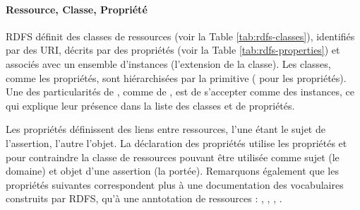 \paragraph{Ressource, Classe, Propriété}
RDFS définit des classes de ressources (voir la Table \ref{tab:rdfs-classes}), identifiés par des URI, décrits par des propriétés (voir la Table \ref{tab:rdfs-properties}) et associés avec un ensemble d'instances (l'extension de la classe). 
Les classes, comme les propriétés, sont hiérarchisées par la primitive  ( pour les propriétés).
Une des particularités de , comme de , est de s'accepter comme des instances, ce qui explique leur présence dans la liste des classes et de propriétés.

Les propriétés définissent des liens entre ressources, l'une étant le sujet de l'assertion, l'autre l'objet.
La déclaration des propriétés utilise les propriétés  et  pour contraindre la classe de ressources pouvant être utilisée comme sujet (le domaine) et objet d'une assertion (la portée).
Remarquons également que les propriétés suivantes correspondent plus à une documentation des vocabulaires construits par RDFS, qu'à une anntotation de ressources : , , , .



